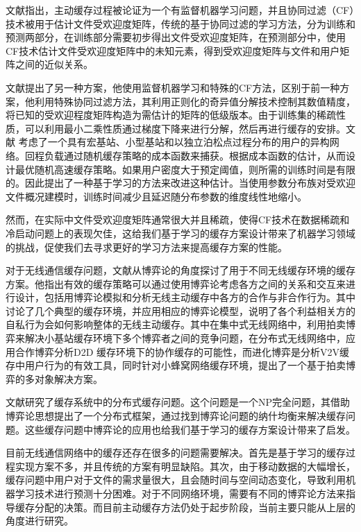 \documentclass[bachelor]{seuthesis} %
\begin{document}
\begin{Main}
文献\cite{bastug2014anticipatory}指出，主动缓存过程被论证为一个有监督机器学习问题，并且协同过滤（CF）技术被用于估计文件受欢迎度矩阵，传统的基于协同过滤的学习方法，分为训练和预测两部分，在训练部分需要初步得出文件受欢迎度矩阵，在预测部分中，使用CF技术估计文件受欢迎度矩阵中的未知元素，得到受欢迎度矩阵与文件和用户矩阵之间的近似关系。\par
文献\cite{bastug2014living}提出了另一种方案，他使用监督机器学习和特殊的CF方法，区别于前一种方案，他利用特殊协同过滤方法，其利用正则化的奇异值分解技术控制其数值精度，将已知的受欢迎程度矩阵构造为需估计的矩阵的低级版本。由于训练集的稀疏性质，可以利用最小二乘性质通过梯度下降来进行分解，然后再进行缓存的安排。文献
\cite{bharath2016learning}考虑了一个具有宏基站、小型基站和以独立泊松点过程分布的用户的异构网络。回程负载通过随机缓存策略的成本函数来捕获。根据成本函数的估计，从而设计最优随机高速缓存策略。如果用户密度大于预定阈值，则所需的训练时间是有限的。因此提出了一种基于学习的方法来改进这种估计。当使用参数分布族对受欢迎文件概况建模时，训练时间减少且延迟随分布参数的维度线性地缩小。\par
然而，在实际中文件受欢迎度矩阵通常很大并且稀疏，使得CF技术在数据稀疏和冷启动问题上的表现欠佳，这给我们基于学习的缓存方案设计带来了机器学习领域的挑战，促使我们去寻求更好的学习方法来提高缓存方案的性能。\par
对于无线通信缓存问题，文献\cite{hu2016game}从博弈论的角度探讨了用于不同无线缓存环境的缓存方案。他指出有效的缓存策略可以通过使用博弈论考虑各方之间的关系和交互来进行设计，包括用博弈论模拟和分析无线主动缓存中各方的合作与非合作行为。其中讨论了几个典型的缓存环境，并应用相应的博弈论模型，说明了各个利益相关方的自私行为会如何影响整体的无线主动缓存。其中在集中式无线网络中，利用拍卖博弈来解决小基站缓存环境下多个博弈者之间的竞争问题，在分布式无线网络中，应用合作博弈分析D2D 缓存环境下的协作缓存的可能性，而进化博弈是分析V2V缓存中用户行为的有效工具，同时针对小蜂窝网络缓存环境，提出了一个基于拍卖博弈的多对象解决方案。\par
文献\cite{tan2016femtocaching}研究了缓存系统中的分布式缓存问题。这个问题是一个NP完全问题，其借助博弈论思想提出了一个分布式框架，通过找到博弈论问题的纳什均衡来解决缓存问题。这些缓存问题中博弈论的应用也给我们基于学习的缓存方案设计带来了启发。\par
目前无线通信网络中的缓存还存在很多的问题需要解决。首先是基于学习的缓存过程实现方案不多，并且传统的方案有明显缺陷。其次，由于移动数据的大幅增长，缓存问题中用户对于文件的需求量很大，且会随时间与空间动态变化，导致利用机器学习技术进行预测十分困难。对于不同网络环境，需要有不同的博弈论方法来指导缓存分配的决策。而目前主动缓存方法仍处于起步阶段，当前主要只能从上层的角度进行研究。

\end{Main}
\end{document}
